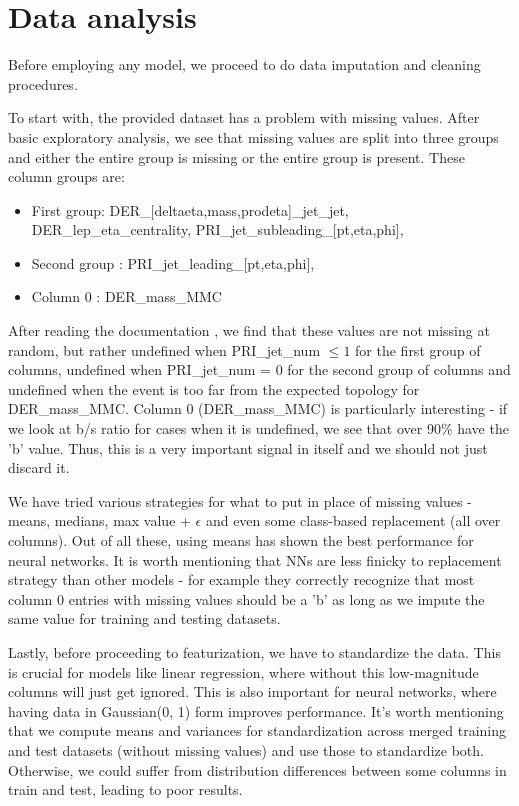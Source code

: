 \documentclass[10pt,conference,compsocconf]{IEEEtran}
\begin{document}
\section{Data analysis}
Before employing any model, we proceed to do data imputation and cleaning procedures.

To start with, the provided dataset has a problem with missing values. After basic exploratory analysis, we see that missing values are split into three groups and either the entire group is missing or the entire group is present. These column groups are:

\begin{itemize}
	\item First group: DER\_[deltaeta,mass,prodeta]\_jet\_jet, DER\_lep\_eta\_centrality, PRI\_jet\_subleading\_[pt,eta,phi],
	\item Second group :  PRI\_jet\_leading\_[pt,eta,phi],
	\item Column 0 : DER\_mass\_MMC
\end{itemize}

After reading the documentation \cite{higgsChallenge}, we find that these values are not missing at random, but rather undefined when PRI\_jet\_num $\leq 1$ for the first group of columns, undefined when PRI\_jet\_num = 0 for the second group of columns and undefined when the event is too far from the expected topology for DER\_mass\_MMC. Column 0 (DER\_mass\_MMC) is particularly interesting - if we look at b/s ratio for cases when it is undefined, we see that over 90\% have the 'b' value. Thus, this is a very important signal in itself and we should not just discard it.
  
We have tried various strategies for what to put in place of missing values - means, medians, max value + $\epsilon$ and even some class-based replacement (all over columns). Out of all these, using means has shown the best performance for neural networks. It is worth mentioning that NNs are less finicky to replacement strategy than other models - for example they correctly recognize that most column 0 entries with missing values should be a 'b' as long as we impute the same value for training and testing datasets.

Lastly, before proceeding to featurization, we have to standardize the data. This is crucial for models like linear regression, where without this low-magnitude columns will just get ignored. This is also important for neural networks, where having data in Gaussian(0, 1) form improves performance. It's worth mentioning that we compute means and variances for standardization across merged training and test datasets (without missing values) and use those to standardize both. Otherwise, we could suffer from distribution differences between some columns in train and test, leading to poor results.
\end{document}
